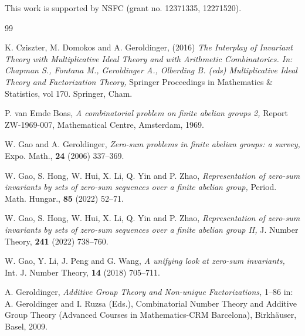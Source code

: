 \documentclass[a4paper, 12pt]{article}
\begin{document}
\bigskip


\noindent This work is supported by NSFC (grant no. 12371335, 12271520).


\begin{thebibliography}{99}










  K. Cziszter, M. Domokos and A. Geroldinger, (2016) \emph{The Interplay of Invariant Theory with Multiplicative Ideal Theory and with Arithmetic Combinatorics. In: Chapman S., Fontana M., Geroldinger A., Olberding B. (eds) Multiplicative Ideal Theory and Factorization Theory,} Springer Proceedings in Mathematics $\&$ Statistics, vol 170. Springer, Cham.


 P. van Emde Boas, \emph{A combinatorial problem on finite abelian groups 2,} Report ZW-1969-007, Mathematical
Centre, Amsterdam, 1969.




 W. Gao and A. Geroldinger, \emph{Zero-sum problems in finite abelian groups:
a survey,} Expo. Math.,  \textbf{24} (2006) 337--369.



 W. Gao, S. Hong, W. Hui, X. Li, Q. Yin and P. Zhao, \emph{Representation of zero-sum invariants by sets of zero-sum
sequences over a finite abelian group,} Period. Math. Hungar., \textbf{85} (2022) 52--71.

 W. Gao, S. Hong, W. Hui, X. Li, Q. Yin and P. Zhao,
\emph{Representation of zero-sum invariants by sets of zero-sum sequences over a finite abelian group II,} J. Number Theory, \textbf{241} (2022) 738--760.


 W. Gao, Y. Li, J. Peng and G. Wang, \emph{A unifying look at zero-sum invariants,} Int. J. Number Theory, \textbf{14} (2018) 705--711.

 A. Geroldinger, \emph{Additive Group Theory and Non-unique Factorizations,} 1--86 in: A. Geroldinger and I. Ruzsa (Eds.), Combinatorial Number
Theory and Additive Group Theory (Advanced Courses in Mathematics-CRM Barcelona), Birkh\"{a}user, Basel, 2009.



\end{thebibliography}
\end{document}
